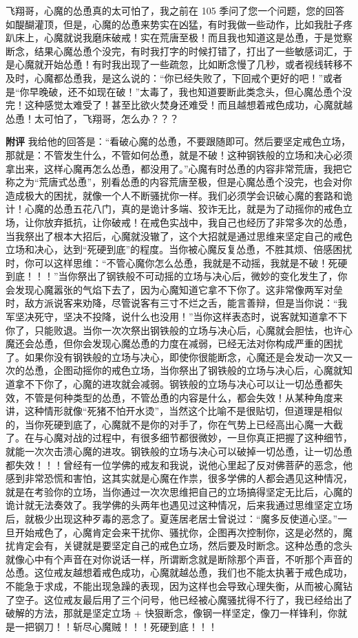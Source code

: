 \begin{case}
    飞翔哥，心魔的怂恿真的太可怕了，我之前在 105 季问了您一个问题，您的回答如醍醐灌顶，但是，心魔的怂恿来势实在凶猛，有时我做一些动作，比如我肚子疼趴床上，心魔就说我磨床破戒！实在荒唐至极！而且我也知道这是怂恿，于是觉察断念，结果心魔怂恿个没完，有时我打字的时候打错了，打出了一些敏感词汇，于是心魔就开始怂恿！有时我出现了一些疏忽，比如断念慢了几秒，或者视线转移不及时，心魔都怂恿我，是这么说的：“你已经失败了，下回戒个更好的吧！”或者是“你早晚破，还不如现在破！”太毒了，我也知道要断此类念头，但心魔怂恿个没完！这种感觉太难受了！甚至比欲火焚身还难受！而且越想着戒色成功，心魔就越怂恿！太可怕了，飞翔哥，怎么办？？？

    \textbf{附评} 我给他的回答是：“看破心魔的怂恿，不要跟随即可。然后要坚定戒色立场，那就是：不管发生什么，不管如何怂恿，就是不破！这种钢铁般的立场和决心必须拿出来，这样心魔再怎么怂恿，都没用了。”心魔有时怂恿的内容非常荒唐，我把它称之为“荒唐式怂恿”，别看怂恿的内容荒唐至极，但是心魔怂恿个没完，也会对你造成极大的困扰，就像一个人不断骚扰你一样。我们必须学会识破心魔的套路和诡计！心魔的怂恿五花八门，真的是诡计多端、狡诈无比，就是为了动摇你的戒色立场，让你放弃抵抗，让你破戒！在戒色实战中，我自己也经历了非常多次的怂恿，当我祭出了根本大招后，心魔就没辙了，这个大招就是通过思维来坚定自己的戒色立场和决心，达到“死硬到底”的程度。当你被心魔反复怂恿，不胜其烦、倍感困扰时，你可以这样思维：“不管心魔你怎么怂恿，我就是不动摇，我就是不破！死硬到底！！！”当你祭出了钢铁般不可动摇的立场与决心后，微妙的变化发生了，你会发现心魔嚣张的气焰下去了，因为心魔知道它拿不下你了。这非常像两军对垒时，敌方派说客来劝降，尽管说客有三寸不烂之舌，能言善辩，但是当你说：“我军坚决死守，坚决不投降，说什么也没用！”当你这样表态时，说客就知道拿不下你了，只能败退。当你一次次祭出钢铁般的立场与决心后，心魔就会胆怯，也许心魔还会怂恿，但你会发现心魔怂恿的力度在减弱，已经无法对你构成严重的困扰了。如果你没有钢铁般的立场与决心，即使你很能断念，心魔还是会发动一次又一次的怂恿，企图动摇你的戒色立场，当你祭出了钢铁般的立场与决心后，心魔就知道拿不下你了，心魔的进攻就会减弱。钢铁般的立场与决心可以让一切怂恿都失效，不管是何种类型的怂恿，不管怂恿的内容是什么，都会失效！从某种角度来讲，这种情形就像“死猪不怕开水烫”，当然这个比喻不是很贴切，但道理是相似的，当你死硬到底了，心魔就不是你的对手了，你在气势上已经高出心魔一大截了。在与心魔对战的过程中，有很多细节都很微妙，一旦你真正把握了这种细节，就能一次次击溃心魔的进攻。钢铁般的立场与决心可以破掉一切怂恿，让一切怂恿都失效！！！曾经有一位学佛的戒友和我说，说他心里起了反对佛菩萨的恶念，他感到非常恐慌和害怕，这其实就是心魔在作祟，很多学佛的人都会遇见这种情况，就是在考验你的立场，当你通过一次次思维把自己的立场搞得坚定无比后，心魔的诡计就无法奏效了。我学佛的头两年也遇见过这种情况，后来我通过思维坚定立场后，就极少出现这种歹毒的恶念了。夏莲居老居士曾说过：“魔多反使道心坚。”一旦开始戒色了，心魔肯定会来干扰你、骚扰你，企图再次控制你，这是必然的，魔扰肯定会有，关键就是要坚定自己的戒色立场，然后要及时断念。这种怂恿的念头就像心中有个声音在对你说话一样，所谓断念就是断除那个声音，不听那个声音的怂恿。这位戒友越想着戒色成功，心魔就越怂恿，我们也不能太执著于戒色成功，不能急于求成，不能出现急躁的表现，因为这样也会导致心理失衡，从而被心魔钻了空子。这位戒友最后用了三个问号，他已经被心魔骚扰得不行了，我已经给出了破解的方法，那就是坚定立场 + 快狠断念，像钢一样坚定，像刀一样锋利，你就是一把钢刀！！斩尽心魔贼！！！死硬到底！！！

\end{case}

